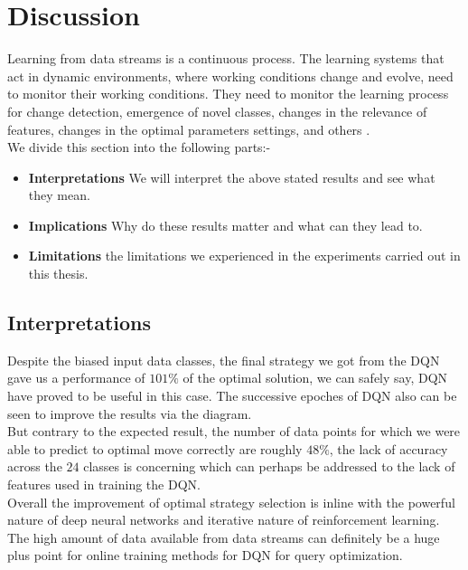 \section{Discussion}
Learning from data streams is a continuous process. The learning systems that act in dynamic environments, where working conditions change and evolve, need to monitor their working conditions. They need to monitor the learning process  for change detection, emergence of novel classes, changes in the relevance of features, changes in the optimal parameters  settings, and others \cite{DNN_for_stream}.\\
We divide this section into the following parts:-
\begin{itemize}
    \item \textbf{Interpretations} We will interpret the above stated results and see what they mean.
    \item \textbf{Implications} Why do these results matter and what can they lead to.
    \item \textbf{Limitations} the limitations we experienced in the experiments carried out in this thesis.
\end{itemize}


\subsection{Interpretations}
Despite the biased input data classes, the final strategy we got from the DQN gave us a performance of $101\%$ of the optimal solution, we can safely say, DQN have proved to be useful in this case. The successive epoches of DQN also can be seen to improve the results via the diagram.\\
But contrary to the expected result, the number of data points for which we were able to predict to optimal move correctly are roughly $48\%$, the lack of accuracy across the $24$ classes is concerning which can perhaps be addressed to the lack of features used in training the DQN.\\
Overall the improvement of optimal strategy selection is inline with the powerful nature of deep neural networks and iterative nature of reinforcement learning. The high amount of data available from data streams can definitely be a huge plus point for online training methods for DQN for query optimization.\\



